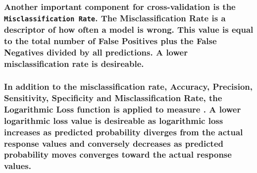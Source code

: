 \documentclass[american,]{article}
\begin{document}
\hypertarget{another-important-component-for-cross-validation-is-the-misclassification-rate.-the-misclassification-rate-is-a-descriptor-of-how-often-a-model-is-wrong.-this-value-is-equal-to-the-total-number-of-false-positives-plus-the-false-negatives-divided-by-all-predictions.-a-lower-misclassification-rate-is-desireable.}{%
\subsubsection{\texorpdfstring{Another important component for cross-validation is the \texttt{Misclassification\ Rate}. The Misclassification Rate is a descriptor of how often a model is wrong. This value is equal to the total number of False Positives plus the False Negatives divided by all predictions. A lower misclassification rate is desireable.}{Another important component for cross-validation is the Misclassification Rate. The Misclassification Rate is a descriptor of how often a model is wrong. This value is equal to the total number of False Positives plus the False Negatives divided by all predictions. A lower misclassification rate is desireable.}}\label{another-important-component-for-cross-validation-is-the-misclassification-rate.-the-misclassification-rate-is-a-descriptor-of-how-often-a-model-is-wrong.-this-value-is-equal-to-the-total-number-of-false-positives-plus-the-false-negatives-divided-by-all-predictions.-a-lower-misclassification-rate-is-desireable.}}

\hypertarget{in-addition-to-the-misclassification-rate-accuracy-precision-sensitivity-specificity-and-misclassification-rate-the-logarithmic-loss-function-is-applied-to-measure-.-a-lower-logarithmic-loss-value-is-desireable-as-logarithmic-loss-increases-as-predicted-probability-diverges-from-the-actual-response-values-and-conversely-decreases-as-predicted-probability-moves-converges-toward-the-actual-response-values.}{%
\subsubsection{In addition to the misclassification rate, Accuracy, Precision, Sensitivity, Specificity and Misclassification Rate, the Logarithmic Loss function is applied to measure . A lower logarithmic loss value is desireable as logarithmic loss increases as predicted probability diverges from the actual response values and conversely decreases as predicted probability moves converges toward the actual response values.}\label{in-addition-to-the-misclassification-rate-accuracy-precision-sensitivity-specificity-and-misclassification-rate-the-logarithmic-loss-function-is-applied-to-measure-.-a-lower-logarithmic-loss-value-is-desireable-as-logarithmic-loss-increases-as-predicted-probability-diverges-from-the-actual-response-values-and-conversely-decreases-as-predicted-probability-moves-converges-toward-the-actual-response-values.}}
\end{document}
